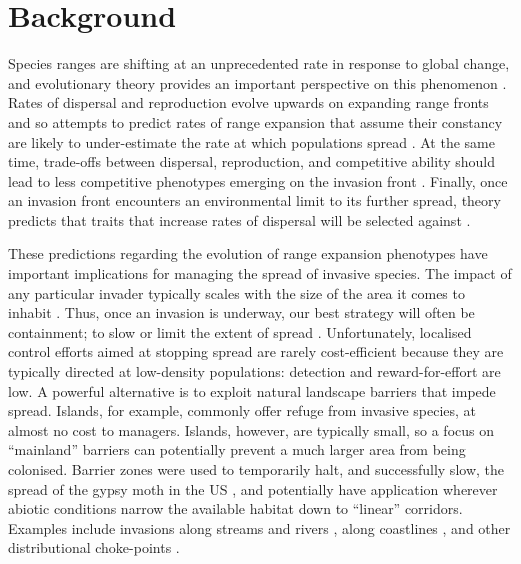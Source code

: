 \documentclass{article}
\begin{document}
\section{Background}
Species ranges are shifting at an unprecedented rate in response to global change, and evolutionary theory provides an important perspective on this phenomenon \citep{Perkins_2012}.  Rates of dispersal and reproduction evolve upwards on expanding range fronts and so attempts to predict rates of range expansion that assume their constancy are likely to under-estimate the rate at which populations spread \citep{Phillips_Brown_Shine_2010}. At the same time, trade-offs between dispersal, reproduction, and competitive ability should lead to less competitive phenotypes emerging on the invasion front \citep{Burton_Travis_Phillips_2010}. Finally, once an invasion front encounters an environmental limit to its further spread, theory predicts that traits that increase rates of dispersal will be selected against \citep{Kubisch_Hovestadt_Poethke_2010, Phillips_2012}.

These predictions regarding the evolution of range expansion phenotypes have important implications for managing the spread of invasive species.  The impact of any particular invader typically scales with the size of the area it comes to inhabit \citep{Epanchin-Niell_Hastings_2010}.  Thus, once an invasion is underway, our best strategy will often be containment; to slow or limit the extent of spread \citep{Sharov_1998}.  Unfortunately, localised control efforts aimed at stopping spread are rarely cost-efficient because they are typically directed at low-density populations: detection and reward-for-effort are low. A powerful alternative is to exploit natural landscape barriers that impede spread. Islands, for example, commonly offer refuge from invasive species, at almost no cost to managers.  Islands, however, are typically small, so a focus on ``mainland'' barriers can potentially prevent a much larger area from being colonised.  Barrier zones were used to temporarily halt, and successfully slow, the spread of the gypsy moth in the US \citep{Sharov_Liebhold_1998}, and potentially have application wherever abiotic conditions narrow the available habitat down to ``linear'' corridors.  Examples include invasions along streams and rivers \citep[e.g.,][]{Kerby_Riley_Kats_Wilson_2005}, along coastlines \citep[e.g.,][]{Cousens_Cousens_2011}, and other distributional choke-points \citep[e.g.,][]{Tingley_Phillips_Letnic_Brown_Shine_Baird_2013}.
\end{document}
